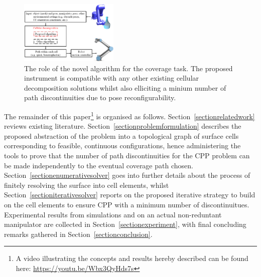 \documentclass[journal]{IEEEtran}
\begin{document}
\begin{figure}[t]
\centering
\includegraphics[width = 0.42\textwidth]{figures/other_figures/relation_3}
\caption{The role of the novel algorithm for the coverage task. The proposed instrument is compatible with any other existing cellular decomposition solutions whilst also 
elliciting a minium number of path discontinuities due to pose reconfigurability.} 
\label{fig:alg_role}
\end{figure}

The remainder of this paper\footnote{A video \label{video} illustrating the concepts and results hereby described can be found here: \url{https://youtu.be/Wbx3QyHds7s}} 
is organised as follows. Section~\ref{sectionrelatedwork} reviews existing literature. 
Section~\ref{sectionproblemformulation} describes the proposed abstraction of the problem into a topological graph of surface cells corresponding 
to feasible, continuous configurations, hence administering the tools to prove that the number of path discontinuities for the CPP problem can be made independently to the eventual coverage path chosen. %
Section~\ref{sectionenumerativesolver} goes into further details about the process of finitely resolving the surface into cell elements, whilst 
Section~\ref{sectioniterativesolver} reports on the proposed iterative strategy to build on the cell elements to ensure CPP with a minimum number of discontinuitues. Experimental results from simulations and on an actual non-reduntant manipulator are collected in Section~\ref{sectionexperiment}, with final concluding remarks gathered in Section~\ref{sectionconclusion}. 
\end{document}
